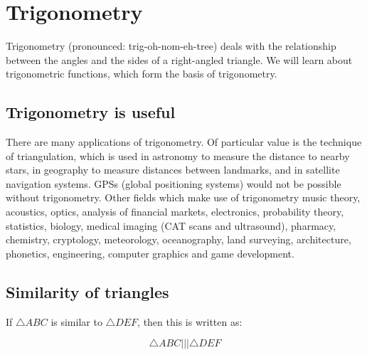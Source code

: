 \chapter{Trigonometry}
\setcounter{figure}{1}
\setcounter{subfigure}{1}

Trigonometry (pronounced: trig-oh-nom-eh-tree) deals with the relationship between the angles and the sides of a right-angled triangle. We will learn about trigonometric functions, which form the basis of trigonometry.\par 

\section{Trigonometry is useful}
\nopagebreak
There are many applications of trigonometry. Of particular value is the technique of triangulation, which is used in astronomy to measure the distance to nearby stars, in geography to measure distances between landmarks, and in satellite navigation systems. GPSs (global positioning systems) would not be possible without trigonometry. Other fields which make use of trigonometry music theory, acoustics, optics, analysis of financial markets, electronics, probability theory, statistics, biology, medical imaging (CAT scans and ultrasound), pharmacy, chemistry, cryptology, meteorology, oceanography, land surveying, architecture, phonetics, engineering, computer graphics and game development.\par 

\section{Similarity of triangles}
\nopagebreak
If $\triangle ABC$ is similar to $ \triangle DEF$, then this is written as:\par 

\begin{equation*}
\triangle ABC||| \triangle DEF
\end{equation*}

